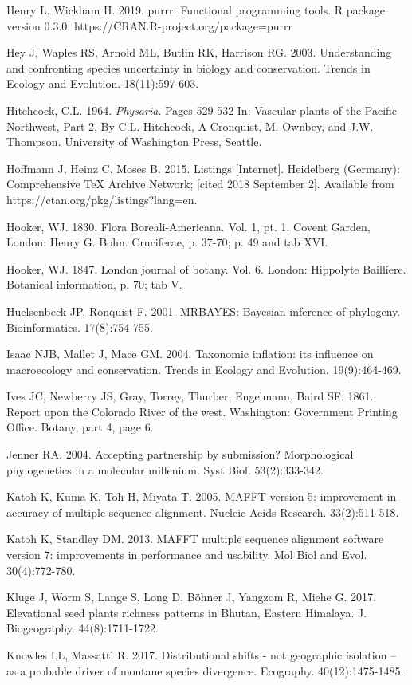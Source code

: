 Henry L, Wickham H. 2019. purrr: Functional programming tools. R package version 0.3.0. https://CRAN.R-project.org/package=purrr

Hey J, Waples RS, Arnold ML, Butlin RK, Harrison RG. 2003. Understanding and confronting species uncertainty in biology and conservation. Trends in Ecology and Evolution. 18(11):597-603.

Hitchcock, C.L. 1964. \textit{Physaria}. Pages 529-532 In: Vascular plants of the Pacific Northwest, Part 2, By C.L. Hitchcock, A Cronquist, M. Ownbey, and J.W. Thompson. University of Washington Press, Seattle.

Hoffmann J, Heinz C, Moses B. 2015. Listings [Internet]. Heidelberg (Germany): Comprehensive TeX Archive Network; [cited 2018 September 2]. Available from https://ctan.org/pkg/listings?lang=en.

Hooker, WJ. 1830. Flora Boreali-Americana. Vol. 1, pt. 1. Covent Garden, London: Henry G. Bohn. Cruciferae, p. 37-70; p. 49 and tab XVI.

Hooker, WJ. 1847. London journal of botany. Vol. 6. London: Hippolyte Bailliere. Botanical information, p. 70; tab V.  

Huelsenbeck JP, Ronquist F. 2001. MRBAYES: Bayesian inference of phylogeny. Bioinformatics. 17(8):754-755.

Isaac NJB, Mallet J, Mace GM. 2004. Taxonomic inflation: its influence on macroecology and conservation. Trends in Ecology and Evolution. 19(9):464-469.

Ives JC, Newberry JS, Gray, Torrey, Thurber, Engelmann, Baird SF. 1861. Report upon the Colorado River of the west. Washington: Government Printing Office. Botany, part 4, page 6. 

Jenner RA. 2004. Accepting partnership by submission? Morphological phylogenetics in a molecular millenium. Syst Biol. 53(2):333-342.

Katoh K, Kuma K, Toh H, Miyata T. 2005. MAFFT version 5: improvement in accuracy of multiple sequence alignment. Nucleic Acids Research. 33(2):511-518.

Katoh K, Standley DM. 2013. MAFFT multiple sequence alignment software version 7: improvements in performance and usability.  Mol Biol and Evol. 30(4):772-780.

Kluge J, Worm S, Lange S, Long D, Böhner J, Yangzom R, Miehe G. 2017. Elevational seed plants richness patterns in Bhutan, Eastern Himalaya. J. Biogeography. 44(8):1711-1722.

Knowles LL, Massatti R. 2017. Distributional shifts - not geographic isolation – as a probable driver of montane species divergence. Ecography. 40(12):1475-1485.

